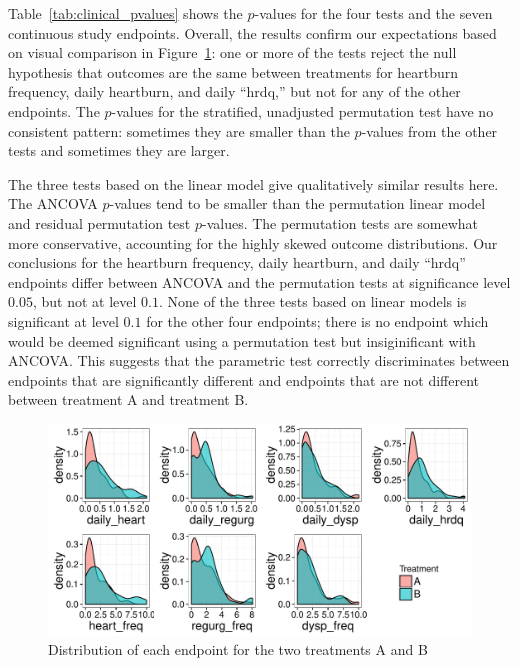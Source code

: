 \documentclass[12pt]{article}
\begin{document}
Table~\ref{tab:clinical_pvalues} shows the $p$-values for the four tests and the seven continuous study endpoints.
Overall, the results confirm our expectations based on visual comparison in Figure~\ref{fig:clinical_distr}:
one or more of the tests reject the null hypothesis that outcomes are the same between treatments for heartburn frequency, daily heartburn, and daily ``hrdq,''
but not for any of the other endpoints.
The $p$-values for the stratified, unadjusted permutation test have no consistent pattern: sometimes they are smaller than the $p$-values from the other tests and sometimes they are larger.

The three tests based on the linear model give qualitatively similar results here.
The ANCOVA $p$-values tend to be smaller than the permutation linear model and residual permutation test $p$-values.
The permutation tests are somewhat more conservative, accounting for the highly skewed outcome distributions.
Our conclusions for the heartburn frequency, daily heartburn, and daily ``hrdq'' endpoints differ between ANCOVA and the permutation tests at significance level $0.05$, but not at level $0.1$.
None of the three tests based on linear models is significant at level $0.1$ for the other four endpoints;
there is no endpoint which would be deemed significant using a permutation test but insiginificant with ANCOVA.
This suggests that the parametric test correctly discriminates between endpoints that are significantly different and endpoints that are not different between treatment A and treatment B.


\begin{figure}
\centering
\includegraphics[width = \textwidth]{fig/clinical_distr.pdf}
\caption{Distribution of each endpoint for the two treatments A and B}
\label{fig:clinical_distr}
\end{figure}

%
%
\end{document}
